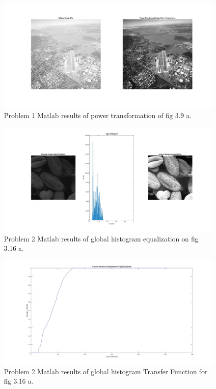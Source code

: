 \documentclass[./rarnold_report2.tex]{subfiles}
\begin{document}
	\begin{figure}[!htbp]
	\centering
	\includegraphics[scale=0.25]{"power_city"}
	\caption{Problem 1 Matlab results of power transformation of fig 3.9 a.} 
	\label{power_city}
	\end{figure}

	\clearpage
	
	
	\begin{figure}[!htbp]
	\centering
	\includegraphics[scale=0.25]{"histo1"}
	\caption{Problem 2 Matlab results of global histogram equalization on fig 3.16 a.} 
	\label{histo1}
	\end{figure}
	
	\begin{figure}[!htbp]
	\centering
	\includegraphics[scale=0.25]{"transfer1"}
	\caption{Problem 2 Matlab results of global histogram Transfer Function for fig 3.16 a.} 
	\label{Tr1}
	\end{figure}
	
\end{document}
